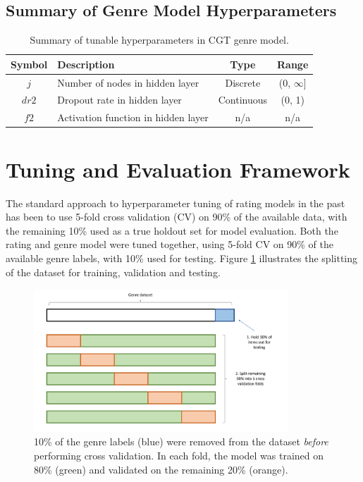 \subsection{Summary of Genre Model Hyperparameters}
\begin{table}[H]
\centering
\begin{tabular}{c | p{3.5cm} | c | c}
\toprule
\textbf{Symbol} & \textbf{Description} & \textbf{Type} & \textbf{Range} \\
\midrule
$j$ & Number of nodes in hidden layer & Discrete & (0, $\infty$] \\
\midrule
$dr2$ & Dropout rate in hidden layer & Continuous & (0, 1) \\
\midrule
$f2$ & Activation function in hidden layer & n/a & n/a \\
\bottomrule
\end{tabular}
\caption[Genre model hyperparameters]{Summary of tunable hyperparameters in CGT genre model.}
\label{tab:genre-hparams}
\end{table}

\section{Tuning and Evaluation Framework}
The standard approach to hyperparameter tuning of rating models in the past has been to use 5-fold cross validation (CV) on 90\% of the available data, with the remaining 10\% used as a true holdout set for model evaluation. Both the rating and genre model were tuned together, using 5-fold CV on 90\% of the available genre labels, with 10\% used for testing. Figure \ref{fig:4_cross-validation} illustrates the splitting of the dataset for training, validation and testing.

\begin{figure}[H]
\centering
\includegraphics[width=0.85\textwidth]{Figures/4_cross-validation-2.pdf}
\decoRule
\caption[Holdout set]{10\% of the genre labels (blue) were removed from the dataset \textit{before} performing cross validation. In each fold, the model was trained on 80\% (green) and validated on the remaining 20\% (orange).}
\label{fig:4_cross-validation}
\end{figure}

